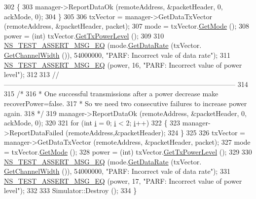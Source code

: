 \begin{DoxyCode}
302     \{
303       manager->ReportDataOk (remoteAddress, &packetHeader, 0, ackMode, 0);
304     \}
305 
306   txVector = manager->GetDataTxVector (remoteAddress, &packetHeader, packet);
307   mode = txVector.\hyperlink{classns3_1_1WifiTxVector_a497b1f11cad4b8b26251dfa07c9ad1d6}{GetMode} ();
308   power = (int) txVector.\hyperlink{classns3_1_1WifiTxVector_a7c98bd9609ff1c5cefa6e22d6908a2fe}{GetTxPowerLevel} ();
309 
310   \hyperlink{group__testing_ga2a9d78cffb3db8e867c35fff0b698cf5}{NS\_TEST\_ASSERT\_MSG\_EQ} (mode.\hyperlink{classns3_1_1WifiMode_adcfbe150f69da720db23387f733b8a52}{GetDataRate} (txVector.
      \hyperlink{classns3_1_1WifiTxVector_a1f8bfa51778a3e217581eb665f059564}{GetChannelWidth} ()), 54000000, \textcolor{stringliteral}{"PARF: Incorrect vale of data rate"});
311   \hyperlink{group__testing_ga2a9d78cffb3db8e867c35fff0b698cf5}{NS\_TEST\_ASSERT\_MSG\_EQ} (power, 16, \textcolor{stringliteral}{"PARF: Incorrect value of power level"});
312 
313   \textcolor{comment}{//-----------------------------------------------------------------------------------------------------}
314 
315   \textcolor{comment}{/*}
316 \textcolor{comment}{   * One successful transmissions after a power decrease make recoverPower=false.}
317 \textcolor{comment}{   * So we need two consecutive failures to increase power again.}
318 \textcolor{comment}{   */}
319   manager->ReportDataOk (remoteAddress, &packetHeader, 0, ackMode, 0);
320 
321   \textcolor{keywordflow}{for} (\textcolor{keywordtype}{int} \hyperlink{bernuolliDistribution_8m_a6f6ccfcf58b31cb6412107d9d5281426}{i} = 0; \hyperlink{bernuolliDistribution_8m_a6f6ccfcf58b31cb6412107d9d5281426}{i} < 2; \hyperlink{bernuolliDistribution_8m_a6f6ccfcf58b31cb6412107d9d5281426}{i}++)
322     \{
323       manager->ReportDataFailed (remoteAddress,&packetHeader);
324     \}
325 
326   txVector = manager->GetDataTxVector (remoteAddress, &packetHeader, packet);
327   mode = txVector.\hyperlink{classns3_1_1WifiTxVector_a497b1f11cad4b8b26251dfa07c9ad1d6}{GetMode} ();
328   power = (int) txVector.\hyperlink{classns3_1_1WifiTxVector_a7c98bd9609ff1c5cefa6e22d6908a2fe}{GetTxPowerLevel} ();
329 
330   \hyperlink{group__testing_ga2a9d78cffb3db8e867c35fff0b698cf5}{NS\_TEST\_ASSERT\_MSG\_EQ} (mode.\hyperlink{classns3_1_1WifiMode_adcfbe150f69da720db23387f733b8a52}{GetDataRate} (txVector.
      \hyperlink{classns3_1_1WifiTxVector_a1f8bfa51778a3e217581eb665f059564}{GetChannelWidth} ()), 54000000, \textcolor{stringliteral}{"PARF: Incorrect vale of data rate"});
331   \hyperlink{group__testing_ga2a9d78cffb3db8e867c35fff0b698cf5}{NS\_TEST\_ASSERT\_MSG\_EQ} (power, 17, \textcolor{stringliteral}{"PARF: Incorrect value of power level"});
332 
333   Simulator::Destroy ();
334 \}
\end{DoxyCode}


